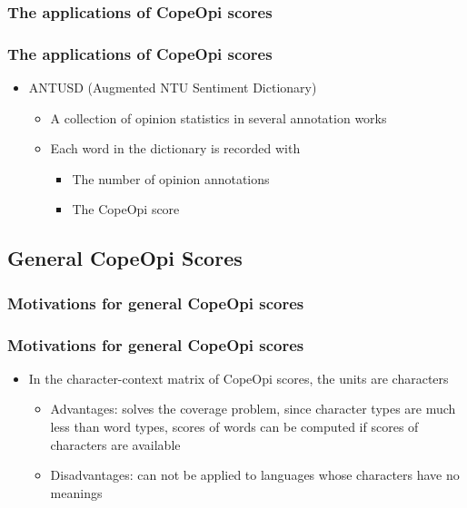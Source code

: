 \documentclass[mathserif]{beamer}
\begin{document}
\subsubsection{The applications of CopeOpi scores}
\begin{frame}
\frametitle{The applications of CopeOpi scores}
\begin{itemize}
\item ANTUSD (Augmented NTU Sentiment Dictionary)
	\begin{itemize}
	\item A collection of opinion statistics in several annotation works
	\item Each word in the dictionary is recorded with
		\begin{itemize}
		\item The number of opinion annotations
		\item The CopeOpi score
		\end{itemize}
	\end{itemize}
\end{itemize}
\end{frame}
\subsection{General CopeOpi Scores}
\subsubsection{Motivations for general CopeOpi scores}
\begin{frame}
\frametitle{Motivations for general CopeOpi scores}
\begin{itemize}
\item In the character-context matrix of CopeOpi scores, the units are characters
	\begin{itemize}
	\item Advantages: solves the coverage problem, since character types are much less than word types, scores of words can be computed if scores of characters are available 
	\item Disadvantages: can not be applied to languages whose characters have no meanings
	\end{itemize}
\end{itemize}
\begin{flushright}
\end{flushright}
\end{frame}
\end{document}
